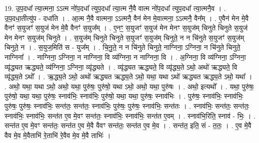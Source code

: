 \documentclass[17pt]{extarticle}
\begin{document}
19. उ॒प॒दधा᳚ त्या॒त्मना॒ ऽऽत्म नो॑प॒दधा᳚ त्युप॒दधा᳚ त्या॒त्म नै॒वै वात्म नो॑प॒दधा᳚ त्युप॒दधा᳚ त्या॒त्मनै॒व । . उ॒प॒दधा॒तीत्यु॑प - दधा॑ति । . आ॒त्म नै॒वै वात्मना॒ ऽऽत्मनै॒ वैन॑ मेन मे॒वात्मना॒ ऽऽत्मनै॒ वैन᳚म् । . ए॒वैन॑ मेन मे॒वै वैनꣳ॑ स॒युजꣳ॑ स॒युज॑ मेन मे॒वै वैनꣳ॑ स॒युज᳚म् । . ए॒नꣳ॒॒ स॒युजꣳ॑ स॒युज॑ मेन मेनꣳ स॒युज॑म् चिनुते चिनुते स॒युज॑ मेन मेनꣳ स॒युज॑म् चिनुते । . स॒युज॑म् चिनुते चिनुते स॒युजꣳ॑ स॒युज॑म् चिनुते॒ न न चि॑नुते स॒युजꣳ॑ स॒युज॑म् चिनुते॒ न । . स॒युज॒मिति॑ स - युज᳚म् । . चि॒नु॒ते॒ न न चि॑नुते चिनुते॒ नाग्निना॒ ऽग्निना॒ न चि॑नुते चिनुते॒ नाग्निना᳚ । . नाग्निना॒ ऽग्निना॒ न नाग्निना॒ वि व्य॑ग्निना॒ न नाग्निना॒ वि । . अ॒ग्निना॒ वि व्य॑ग्निना॒ ऽग्निना॒ व्यृ॑द्ध्यत ऋद्ध्यते॒ व्य॑ग्निना॒ ऽग्निना॒ व्यृ॑द्ध्यते । . व्यृ॑द्ध्यत ऋद्ध्यते॒ वि व्यृ॑द्ध्य॒ते ऽथो॒ अथो॑ ऋद्ध्यते॒ वि व्यृ॑द्ध्य॒ते ऽथो᳚ । . ऋ॒द्ध्य॒ते ऽथो॒ अथो॑ ऋद्ध्यत ऋद्ध्य॒ते ऽथो॒ यथा॒ यथा ऽथो॑ ऋद्ध्यत ऋद्ध्य॒ते ऽथो॒ यथा᳚ । . अथो॒ यथा॒ यथा ऽथो॒ अथो॒ यथा॒ पुरु॑षः॒ पुरु॑षो॒ यथा ऽथो॒ अथो॒ यथा॒ पुरु॑षः । . अथो॒ इत्यथो᳚ । . यथा॒ पुरु॑षः॒ पुरु॑षो॒ यथा॒ यथा॒ पुरु॑षः॒ स्नाव॑भिः॒ स्नाव॑भिः॒ पुरु॑षो॒ यथा॒ यथा॒ पुरु॑षः॒ स्नाव॑भिः । . पुरु॑षः॒ स्नाव॑भिः॒ स्नाव॑भिः॒ पुरु॑षः॒ पुरु॑षः॒ स्नाव॑भिः॒ सन्त॑तः॒ सन्त॑तः॒ स्नाव॑भिः॒ पुरु॑षः॒ पुरु॑षः॒ स्नाव॑भिः॒ सन्त॑तः । . स्नाव॑भिः॒ सन्त॑तः॒ सन्त॑तः॒ स्नाव॑भिः॒ स्नाव॑भिः॒ सन्त॑त ए॒व मे॒वꣳ सन्त॑तः॒ स्नाव॑भिः॒ स्नाव॑भिः॒ सन्त॑त ए॒वम् । . स्नाव॑भि॒रिति॒ स्नाव॑ - भिः॒ । . सन्त॑त ए॒व मे॒वꣳ सन्त॑तः॒ सन्त॑त ए॒व मे॒वै वैवꣳ सन्त॑तः॒ सन्त॑त ए॒व मे॒व । . सन्त॑त॒ इति॒ सं - त॒तः॒ । . ए॒व मे॒वै वैव मे॒व मे॒वैताभि॑ रे॒ताभि॑ रे॒वैव मे॒व मे॒वै ताभिः॑ । \newline
\end{document}
